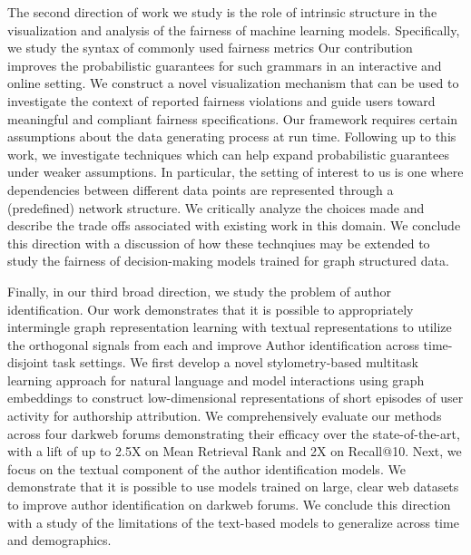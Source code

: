 The second direction of work we study is the role of intrinsic structure in the visualization and analysis of the fairness of machine learning models.
Specifically, we study the syntax of commonly used fairness metrics 
Our contribution improves the probabilistic guarantees for such grammars in an interactive and online setting.
We construct a novel visualization mechanism that can be used to investigate the context of reported fairness violations and guide users toward meaningful and compliant fairness specifications.
Our framework requires certain assumptions about the data generating process at run time.
Following up to this work, we investigate techniques which can help expand probabilistic guarantees under weaker assumptions.
In particular, the setting of interest to us is one where dependencies between different data points are represented through a (predefined) network structure. We critically analyze the choices made and describe the trade offs associated with existing work in this domain.
We conclude this direction with a discussion of how these technqiues may be extended to study the fairness of decision-making models trained for graph structured data.

Finally, in our third broad direction, we study the problem of author identification.
Our work demonstrates that it is possible to appropriately intermingle graph representation learning with textual representations to utilize the orthogonal signals from each and improve Author identification across time-disjoint task settings.
We first develop a novel stylometry-based multitask learning approach for natural language and model interactions using graph embeddings to construct low-dimensional representations of short episodes of user activity for authorship attribution. 
We comprehensively evaluate our methods across four darkweb forums demonstrating their efficacy over the state-of-the-art, with a lift of up to 2.5X on Mean Retrieval Rank and 2X on Recall@10.
Next, we focus on the textual component of the author identification models.
We demonstrate that it is possible to use models trained on large, clear web datasets to improve author identification on darkweb forums.
We conclude this direction with a study of the limitations of the text-based models to generalize across time and demographics.



